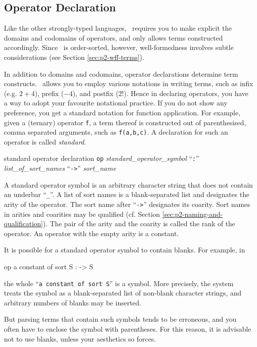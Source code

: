 \documentclass[a4paper]{memoir}
\begin{document}
\subsection{Operator Declaration}\label{sec:p2-op-decl}

Like the other strongly-typed languages, \cafeobj~requires you to make
explicit the domains and
codomains of operators, and only allows terms constructed accordingly.
Since \cafeobj~is order-sorted, however, well-formedness involves
subtle considerations (see Section \ref{sec:p2-wff-terms}).

In addition to domains and codomains, operator declarations determine
term constructs.
\cafeobj~allows you to employ various notations in writing terms,
such as infix (e.g. $2 + 4$), prefix ($- 4$), and postfix ($2!$).
Hence in declaring operators, you have a way to adopt your favourite
notational practice. If you do not show any preference, you get
a standard notation for function application.
For example, given a (ternary) operator \verb|f|,
a term thereof is constructed out of parenthesised, comma separated
arguments, such as \verb|f(a,b,c)|.
A declaration for such an operator is called {\em standard}.

\begin{bsyntax} standard operator declaration  \Hline
{}
\texttt{op} \textit{standard\_operator\_symbol} ``\texttt{:}'' \textit{list\_of\_sort\_names} ``\texttt{->}'' \textit{sort\_name}
\end{bsyntax}

A standard operator symbol is an arbitrary character string that
does not contain an underbar ``\verb|_|''. A list of
sort names is a blank-separated list and designates the arity
of the operator. The sort name after ``\verb|->|'' designates its
coarity.
Sort names in arities and coarities may be qualified
(cf. Section \ref{sec:p2-naming-and-qualification}).
The pair of the arity and the coarity is called the rank
of the operator. An operator with the empty arity is a
constant.

\begin{warning}
  It is possible for a standard operator symbol to contain blanks. For
  example, in
  \begin{vvtm}
  \begin{ccode}
    op a constant of sort S : -> S
  \end{ccode}
  \end{vvtm}
  the whole ``\verb|a constant of sort S|'' is a symbol. More precisely,
  the system treats the symbol as a blank-separated list of non-blank
  character strings, and arbitrary numbers of blanks may be inserted.

  But parsing terms that contain such symbols tends to be erroneous, and
  you often have to enclose the symbol with parentheses. For this reason,
  it is advisable not to use blanks, unless your aesthetics so forces.
\end{warning}
\end{document}
